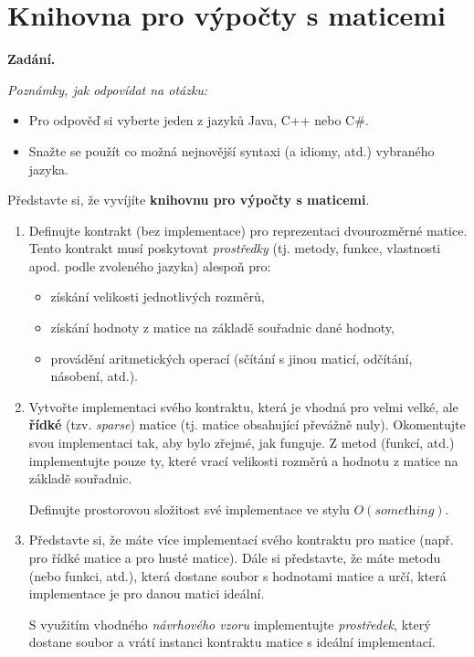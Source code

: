 \section{Knihovna pro výpočty s maticemi}

\noindent\textbf{Zadání.}\par
\textit{Poznámky, jak odpovídat na otázku:}
\begin{itemize}
\item Pro odpověď si vyberte jeden z jazyků Java, C++ nebo C\#.
\item Snažte se použít co možná nejnovější syntaxi (a idiomy, atd.) vybraného jazyka.
\end{itemize}

Představte si, že vyvíjíte \textbf{knihovnu pro výpočty s maticemi}.

\begin{enumerate}
\item Definujte kontrakt (bez implementace) pro reprezentaci dvourozměrné matice. Tento
  kontrakt musí poskytovat \textit{prostředky} (tj. metody, funkce, vlastnosti apod.
  podle zvoleného jazyka) alespoň pro:
  \begin{itemize}
  \item získání velikosti jednotlivých rozměrů,
  \item získání hodnoty z matice na základě souřadnic dané hodnoty,
  \item provádění aritmetických operací (sčítání s jinou maticí, odčítání, násobení, atd.).
  \end{itemize}

\item Vytvořte implementaci svého kontraktu, která je vhodná pro velmi velké, ale
  \textbf{řídké} (tzv. \textit{sparse}) matice (tj. matice obsahující převážně nuly).
  Okomentujte svou implementaci tak, aby bylo zřejmé, jak funguje. Z metod (funkcí, atd.)
  implementujte pouze ty, které vrací velikosti rozměrů a hodnotu z matice na základě
  souřadnic.

  Definujte prostorovou složitost své implementace ve stylu $O(\textit{something})$.

\item Představte si, že máte více implementací svého kontraktu pro matice (např. pro řídké
  matice a pro husté matice). Dále si představte, že máte metodu (nebo funkci, atd.),
  která dostane soubor s hodnotami matice a určí, která implementace je pro danou matici
  ideální.

  S využitím vhodného \textit{návrhového vzoru} implementujte \textit{prostředek}, který
  dostane soubor a vrátí instanci kontraktu matice s ideální implementací.
\end{enumerate}

